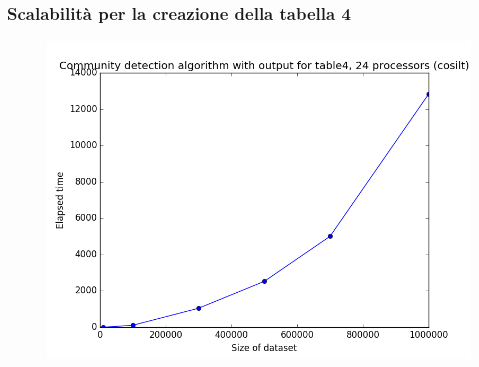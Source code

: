 \documentclass{beamer}
\begin{document}
\begin{frame}
 \frametitle{Scalabilità per la creazione della tabella 4}

  \begin{figure}[htbp]
\centering
\includegraphics[height=6.0 cm,width=10 cm]{24cores_table4.png}

\end{figure}
\end{frame}
\end{document}
